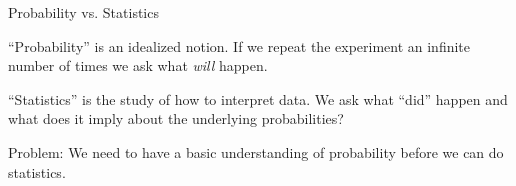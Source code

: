 \begin{frame}{Probability vs. Statistics}

  ``Probability'' is an idealized notion. If we repeat the experiment
  an infinite number of times we ask what \textit{will} happen.

  \vfill

  ``Statistics'' is the study of how to interpret data. We ask what
  ``did'' happen and what does it imply about the underlying
  probabilities?

  \vfill

  {

    Problem: We need to have a basic understanding of probability
    before we can do statistics.

  }
  
\end{frame}

